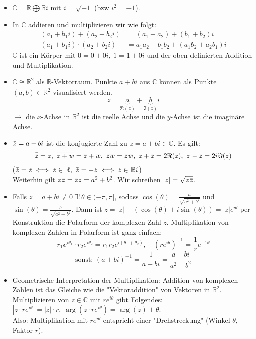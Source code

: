 \documentclass[a4paper,12pt]{article}
\theoremstyle{newthm}
\theoremstyle{newdef}
\theoremstyle{newrem}
\newcommand{\R}{\mathbb{R}}
\newcommand{\C}{\mathbb{C}}
\newcommand{\overbar}[1]{\mkern 1.5mu\overline{\mkern-1.5mu#1\mkern-1.5mu}\mkern 1.5mu}
\begin{document}
		\begin{itemize}
			\item $ \C = \R \bigoplus \R i $ mit $ i = \sqrt{-1} $ (bzw $ i^2 = -1 $). 
			
			\item In $\C$ addieren und multiplizieren wir wie folgt:
			\begin{align*}
			(a_1 + b_1i) + (a_2 + b_2i) &= (a_1 + a_2) + (b_1 + b_2)i\\
			(a_1 + b_1i) \cdot (a_2 + b_2i) &= a_1a_2 - b_1b_2 + (a_1b_2 + a_2b_1)i
			\end{align*}
			$\C$ ist ein Körper mit $ 0 = 0+0i,\ 1 = 1+0i $ und der oben definierten Addition und Multiplikation.
			
			\item $ \C \cong \R^2 $ als $\R$-Vektorraum. Punkte $ a+bi $ aus $\C$ können als Punkte $ (a,b) \in \R^2 $ visualisiert werden.
			\[ z= \underbrace{a}_{\Re(z)} + \underbrace{b}_{\Im(z)}i \]
			$ \rightarrow $ die $x$-Achse in $\R^2$ ist die reelle Achse und die $y$-Achse ist die imaginäre Achse.
			
			\item $ \overbar{z} = a-bi $ ist die konjugierte Zahl zu $ z = a+bi \in \C $. Es gilt:
			\[ \overbar{\overbar{z}} = z,\ \overbar{z+w} = \overbar{z} + \overbar{w},\ \overbar{zw} = \overbar{z} \overbar{w},\ z + \overbar{z} = 2\Re(z),\ z - \overbar{z} = 2i\Im(z) \]
			($ \overbar{z} = z \iff z \in \R,\ \overbar{z} = -z \iff z \in \R i $)\\
			Weiterhin gilt $ z \overbar{z} = \overbar{z} z = a^2 + b^2 $. Wir schreiben $ |z| = \sqrt{z \overbar{z}} $.
			
			\item Falls $ z = a+bi \neq 0\ \exists!\, \theta \in (-\pi,\pi] $, sodass $ \cos(\theta) = \frac{a}{\sqrt{a^2+b^2}} $ und $ \sin(\theta) = \frac{b}{\sqrt{a^2+b^2}}. $ Dann ist $ z = |z| + (\cos(\theta) + i\sin(\theta)) = |z| e^{i \theta} $ per Konstruktion die Polarform der komplexen Zahl $z$. Multiplikation von komplexen Zahlen in Polarform ist ganz einfach:
			\[ r_1 e^{i\theta_1} \cdot r_2 e^{i\theta_2} = r_1r_2 e^{i(\theta_1 + \theta_2)},\quad \left( re^{i\theta} \right)^{-1} = \frac{1}{r} e^{-1\theta} \]
			\[ \text{sonst: } (a+bi)^{-1} = \frac{1}{a+bi} = \frac{a-bi}{a^2+b^2} \]
			
			\item Geometrische Interpretation der Multiplikation: Addition von komplexen Zahlen ist das Gleiche wie die "Vektoraddition" von Vektoren in $\R^2$. Multiplizieren von $ z \in \C $ mit $ re^{i\theta} $ gibt Folgendes: $ |z \cdot re^{i\theta}| = |z| \cdot r,\ \arg(z \cdot re^{i\theta}) = \arg(z) + \theta $.\\
			Also: Multiplikation mit $ re^{i\theta} $ entspricht einer "Drehstreckung" (Winkel $\theta$, Faktor $r$).
			

\end{itemize}
\end{document}
